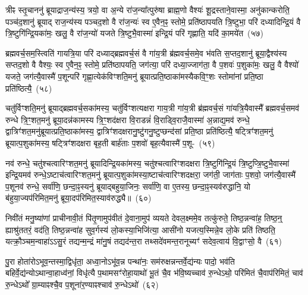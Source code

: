 {\anuvakamend[{विप्रा॑नुमदित॒ इत्या॑ह च॒नास्मै॒ होतो॑प॒भृद्दे॒वता॑ ए॒व त्रीणि॑ च}]}%

त्रीꣴ स्तृ॒चाननु॑ ब्रूयाद्राज॒न्य॑स्य॒ त्रयो॒ वा अ॒न्ये रा॑ज॒न्या᳚त्पुरु॑षा ब्राह्म॒णो वैश्यः॑ शू॒द्रस्ताने॒वास्मा॒ अनु॑कान्करोति॒ पञ्च॑द॒शानु॑ ब्रूयाद् राज॒न्य॑स्य पञ्चद॒शो वै रा॑ज॒न्यः॑ स्व ए॒वैन॒ꣴ॒ स्तोमे॒ प्रति॑\-ष्ठापयति त्रि॒ष्टुभा॒ परि॑ दध्यादिन्द्रि॒यं वै त्रि॒ष्टुगि॑न्द्रि॒यका॑मः॒ खलु॒ वै रा॑ज॒न्यो॑ यजते त्रि॒ष्टुभै॒वास्मा॑ इन्द्रि॒यं परि॑ गृह्णाति॒ यदि॑ का॒मये॑त~(५७)

ब्रह्मवर्च॒सम॒स्त्विति॑ गायत्रि॒या परि॑ दध्याद्ब्रह्मवर्च॒सं वै गा॑य॒त्री ब्र॑ह्मवर्च॒समे॒व भ॑वति स॒प्तद॒शानु॑ ब्रूया॒द्वैश्य॑स्य सप्तद॒शो वै वैश्यः॒ स्व ए॒वैन॒ꣴ॒ स्तोमे॒ प्रति॑\-ष्ठापयति॒ जग॑त्या॒ परि॑ दध्या॒ज्जाग॑ता॒ वै प॒शवः॑ प॒शुका॑मः॒ खलु॒ वै वैश्यो॑ यजते॒ जग॑त्यै॒वास्मै॑ प॒शून्परि॑ गृह्णा॒त्येक॑विꣳशति॒मनु॑ ब्रूयात्प्रति॒ष्ठाका॑मस्यैकवि॒ꣳ॒शः स्तोमा॑नां प्रति॒ष्ठा प्रति॑ष्ठित्यै॒~(५८)

चतु॑र्विꣳशति॒मनु॑ ब्रूयाद्ब्रह्मवर्च॒सका॑मस्य॒ चतु॑र्विꣳशत्यक्षरा गाय॒त्री गा॑य॒त्री ब्र॑ह्मवर्च॒सं गा॑यत्रि॒यैवास्मै᳚ ब्रह्मवर्च॒समव॑ रुन्धे त्रि॒ꣳ॒शत॒\-मनु॑ ब्रूया॒दन्न॑कामस्य त्रि॒ꣳ॒शद॑क्षरा वि॒राडन्नं॑ वि॒राड्वि॒रा\-जै॒\-वा\-स्मा॑ अ॒न्नाद्\-य॒\-मव॑ रुन्धे॒ द्वात्रिꣳ॑शत॒\-मनु॑\-ब्रूयात्प्र\-ति॒ष्ठा\-का॑मस्य॒ द्वात्रिꣳ॑शद\-क्षरा\-नु॒ष्टु॑ग\-नु॒ष्टुप्छन्द॑सां प्रति॒ष्ठा प्रति॑ष्ठित्यै॒ षट्त्रिꣳ॑शत॒मनु॑ ब्रूयात्प॒शुका॑मस्य॒ षट्त्रिꣳ॑शदक्षरा बृह॒ती बार्\mbox{}ह॑ताः प॒शवो॑ बृह॒त्यैवास्मै॑ प॒शू-~(५९)

नव॑ रुन्धे॒ चतु॑श्चत्वारिꣳशत॒मनु॑ ब्रूयादिन्द्रि॒यका॑मस्य॒ चतु॑श्चत्वारिꣳशद\-क्षरा त्रि॒ष्टुगि॑न्द्रि॒यं त्रि॒ष्टुप्त्रि॒ष्टुभै॒वास्मा॑ इन्द्रि॒यमव॑ रुन्धे॒\-ऽष्टाच॑त्वारिꣳशत॒मनु॑ ब्रूयात्प॒शुका॑मस्या॒ष्टाच॑त्वारिꣳशद\-क्षरा॒ जग॑ती॒ जाग॑ताः प॒शवो॒ जग॑त्यै॒वास्मै॑ प॒शूनव॑ रुन्धे॒ सर्वा॑णि॒ छन्दा॒ꣴ॒स्यनु॑ ब्रूयाद्बहुया॒जिनः॒ सर्वा॑णि॒ वा ए॒तस्य॒ छन्दा॒ꣴ॒स्यव॑रुद्धानि॒ यो ब॑हुया॒ज्यप॑रिमित॒मनु॑ ब्रूया॒दप॑रिमित॒स्याव॑रुद्ध्यै॥~(६०)

{\anuvakamend[{का॒मये॑त॒ प्रति॑ष्ठित्यै प॒शून्थ्स॒प्तच॑त्वारिꣳशच्च}]}%

निवी॑तं मनु॒ष्या॑णां प्राचीनावी॒तं पि॑तृ॒णामुप॑वीतं दे॒वाना॒मुप॑ व्ययते देवल॒क्ष्ममे॒व तत्कु॑रुते॒ तिष्ठ॒न्नन्वा॑ह॒ तिष्ठ॒न्॒ ह्याश्रु॑ततरं॒ वद॑ति॒ तिष्ठ॒न्नन्वा॑ह सुव॒र्गस्य॑ लो॒कस्या॒भिजि॑त्या॒ आसी॑नो यजत्य॒स्मिन्ने॒व लो॒के प्रति॑ तिष्ठति॒ यत्क्रौ॒ञ्चम॒न्वाहा॑\-ऽऽ\-सु॒रं तद्यन्म॒न्द्रं मा॑नु॒षं तद्यद॑न्त॒रा तथ्सदे॑वमन्त॒रानूच्यꣳ॑ सदेव॒त्वाय॑ वि॒द्वाꣳसो॒ वै~(६१)

पु॒रा होता॑रो\-ऽभूव॒न्तस्मा॒द्विधृ॑ता॒ अध्वा॒नो\-ऽभू॑व॒न्न पन्था॑नः॒ सम॑रुक्षन्नन्तर्वे॒द्य॑न्यः पादो॒ भव॑ति बहिर्वे॒द्य॑न्यो\-ऽथान्वा॒हाध्व॑नां॒ विधृ॑त्यै प॒थामसꣳ॑रोहा॒याथो॑ भू॒तं चै॒व भ॑वि॒ष्यच्चाव॑ रु॒न्धे\-ऽथो॒ परि॑मितं चै॒वाप॑रिमितं॒ चाव॑ रु॒न्धे\-ऽथो᳚ ग्रा॒म्याꣴश्चै॒व प॒शूना॑र॒ण्याꣴश्चाव॑ रु॒न्धे\-ऽथो॑~(६२)

